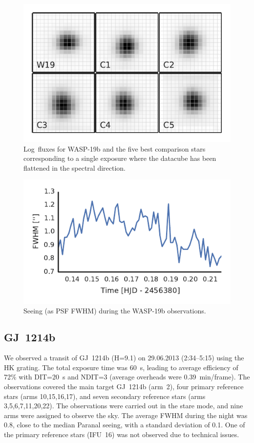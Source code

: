 \documentclass[useAMS,usenatbib]{mn2e}
\begin{document}
\begin{figure}
 \centering
 \includegraphics[width=\columnwidth]{wasp_19_ifus.pdf}
 \caption{Log~fluxes for WASP-19b and the five best comparison stars corresponding to a single exposure where the 
datacube has been flattened in the spectral direction.}
 \label{fig:wasp_19b_ifus}
\end{figure}

\begin{figure}
 \centering
 \includegraphics[width=\columnwidth]{wasp_19_seeing.pdf}
 \caption{Seeing (as PSF FWHM) during the WASP-19b observations.}
 \label{fig:wasp_19b_seeing}
\end{figure}


\subsection{GJ~1214b}
\label{sec:observations:gj_1214b}

We observed a transit of GJ~1214b (H=9.1) on 29.06.2013 (2:34--5:15) using the HK grating. The total 
exposure time  was 60~s, leading to average efficiency of 72\% with DIT=20~s and NDIT=3 (average overheads were 
0.39~min/frame). The observations covered the main target GJ~1214b (arm~2), four primary reference stars (arms 
10,15,16,17), and seven secondary reference stars (arms 
3,5,6,7,11,20,22). The observations were carried out in the stare mode, and nine arms were assigned to observe the sky. 
The average FWHM during the night was 0.8\arcsec{}, close to the median Paranal seeing, with a standard deviation of 
0.1\arcsec.
One of the primary reference stars (IFU~16) was not observed due to technical issues.
\end{document}
